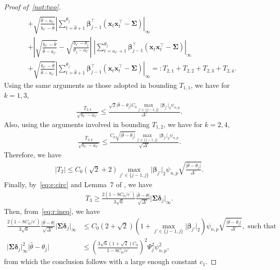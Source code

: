 \documentclass[11pt, a4paper]{article}
\newcommand{\mbf}{\mathbf}
\renewcommand{\l}{\left}
\renewcommand{\r}{\right}
\def\wh{\widehat}
\newcommand{\cp}{\theta}
\newcommand{\nn}{\nonumber}
\theoremstyle{definition}
\theoremstyle{definition}
\theoremstyle{definition}
\theoremstyle{definition}
\theoremstyle{definition}
\theoremstyle{remark}
\theoremstyle{definition}
\theoremstyle{definition}
\theoremstyle{definition}
\begin{document}
\begin{proof}[Proof of~\ref{not:two}]
\begin{align*}
	\\
	& + \sqrt{\frac{\wh\cp - a_{\ell^\circ}}{b_{\ell^\circ} - \wh\cp}} \l\vert \sum_{t = \wh\cp + 1}^{\cp_j} \bm\beta_{j - 1}^\top \l( \mbf x_t \mbf x_t^\top - \bm\Sigma \r) \r\vert_\infty
	\\ 
	& + \l\vert \sqrt{\frac{b_{\ell^\circ} - \wh\cp}{\wh\cp - a_{\ell^\circ}}} -  \sqrt{\frac{b_{\ell^\circ} - \cp_j}{\cp_j - a_{\ell^\circ}}} \r\vert \; \l\vert \sum_{t = a_{\ell^\circ} + 1}^{\cp_j} \bm\beta_{j - 1}^\top \l( \mbf x_t \mbf x_t^\top - \bm\Sigma \r) \r\vert_\infty
	\\
	& + \sqrt{\frac{b_{\ell^\circ} - \wh\cp}{\wh\cp - a_{\ell^\circ}}} \l\vert \sum_{t = \wh\cp + 1}^{\cp_j} \bm\beta_{j - 1}^\top \l( \mbf x_t \mbf x_t^\top - \bm\Sigma \r) \r\vert_\infty
	=: T_{2, 1} + T_{2, 2} + T_{2, 3} + T_{2, 4}.
	\end{align*}
	Using the same arguments as those adopted in bounding $T_{1, 1}$, we have for $k = 1, 3$,
	\begin{align*}
	\frac{T_{2, k}}{\sqrt{b_{\ell^\circ} - a_{\ell^\circ}}} \le \frac{\sqrt{2} \vert \wh\cp - \cp_j \vert C_0 \max_{j' \in \{j - 1, j\}} \vert \bm\beta_{j'} \vert_2 \psi_{n, p}}{\Delta^\circ}.
	\end{align*}
	Also, using the arguments involved in bounding $T_{1, 2}$, we have for $k = 2, 4$,
	\begin{align*}
	\frac{T_{2, k}}{\sqrt{b_{\ell^\circ} - a_{\ell^\circ}}} \le \frac{ C_0 \sqrt{\vert \wh\cp - \cp_j \vert}  \max_{j' \in \{j - 1, j\}} \vert \bm\beta_{j'} \vert_2 \psi_{n, p}}{\sqrt{\Delta^\circ}}.
	\end{align*}
	Therefore, we have
	\begin{align*}
	\vert T_2 \vert \le C_0 ( \sqrt{2} + 2 ) \max_{j' \in \{j - 1, j\}} \vert \bm\beta_{j'} \vert_2 \psi_{n, p} \sqrt{\frac{\vert \wh\cp - \cp_j \vert}{\Delta^\circ}}.
	\end{align*}
	Finally, by~\eqref{eq:e:circ} and Lemma~7 of \cite{wang2018high}, we have
	\begin{align*}
	T_3 \ge \frac{2(1 - 8C_0/c^{\prime})}{3\sqrt{6}} \frac{\vert \wh\cp - \cp \vert}{\sqrt{\Delta^\circ}} \vert \bm\Sigma \bm\delta_j \vert_\infty.
	\end{align*}
	Then, from~\eqref{eq:r:ineq}, we have
	\begin{align}
	\frac{2(1 - 8C_0/c^\prime)}{3\sqrt{6}} \frac{\vert \wh\cp - \cp \vert}{\sqrt{\Delta^\circ}} \vert \bm\Sigma \bm\delta_j \vert_\infty & \le C_0 (2 + \sqrt{2}) \l( 1 + \max_{j' \in \{j - 1, j\}} \vert \bm\beta_{j'} \vert_2 \r) \psi_{n, p} \sqrt{\frac{\vert \wh\cp - \cp_j \vert}{\Delta^\circ}}, \text{ \ such that} \nn \\
	\vert \bm\Sigma \bm\delta_j \vert_\infty^2 \vert \wh\cp - \cp_j \vert & \le \l(\frac{3\sqrt{6}(1 + \sqrt{2})C_0}{1 - 8C_0/c^\prime}\r)^2 \Psi_j^2 \psi_{n, p}^2, \nn
	\end{align}
	from which the conclusion follows with a large enough constant $c_1$.
\end{proof}
\end{document}

